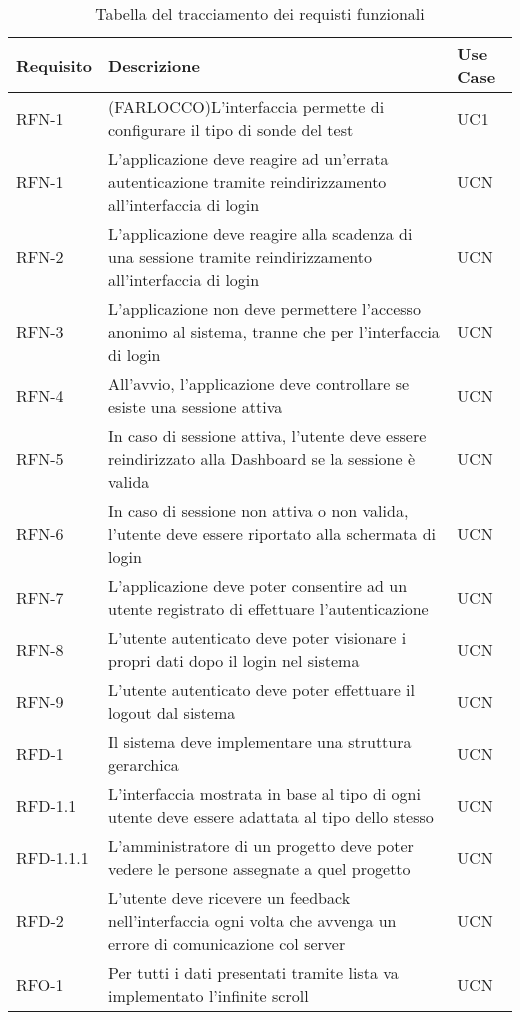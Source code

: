 \begin{table}%
\caption{Tabella del tracciamento dei requisti funzionali}
\label{tab:requisiti-funzionali}
\begin{tabularx}{\textwidth}{lXl}
\hline\hline
\textbf{Requisito} & \textbf{Descrizione} & \textbf{Use Case}\\
\hline
RFN-1     & (FARLOCCO)L'interfaccia permette di configurare il tipo di sonde del test & UC1 \\
RFN-1 & L'applicazione deve reagire ad un'errata autenticazione tramite reindirizzamento all'interfaccia di login & UCN \\
RFN-2 & L'applicazione deve reagire alla scadenza di una sessione tramite reindirizzamento all'interfaccia di login & UCN \\
RFN-3 & L'applicazione non deve permettere l'accesso anonimo al sistema, tranne che per l'interfaccia di login & UCN \\
RFN-4 & All'avvio, l'applicazione deve controllare se esiste una sessione attiva & UCN \\
RFN-5 & In caso di sessione attiva, l'utente deve essere reindirizzato alla Dashboard se la sessione è valida & UCN \\
RFN-6 & In caso di sessione non attiva o non valida, l'utente deve essere riportato alla schermata di login & UCN \\
RFN-7 & L'applicazione deve poter consentire ad un utente registrato di effettuare l'autenticazione & UCN \\
RFN-8 & L'utente autenticato deve poter visionare i propri dati dopo il login nel sistema & UCN \\
RFN-9 & L'utente autenticato deve poter effettuare il logout dal sistema & UCN \\
RFD-1 & Il sistema deve implementare una struttura gerarchica & UCN \\
RFD-1.1 & L'interfaccia mostrata in base al tipo di ogni utente deve essere adattata al tipo dello stesso & UCN \\
RFD-1.1.1 & L'amministratore di un progetto deve poter vedere le persone assegnate a quel progetto & UCN \\
RFD-2 & L'utente deve ricevere un feedback nell'interfaccia ogni volta che avvenga un errore di comunicazione col server & UCN \\
RFO-1 & Per tutti i dati presentati tramite lista va implementato l'infinite scroll & UCN \\
\hline
\end{tabularx}
\end{table}%

